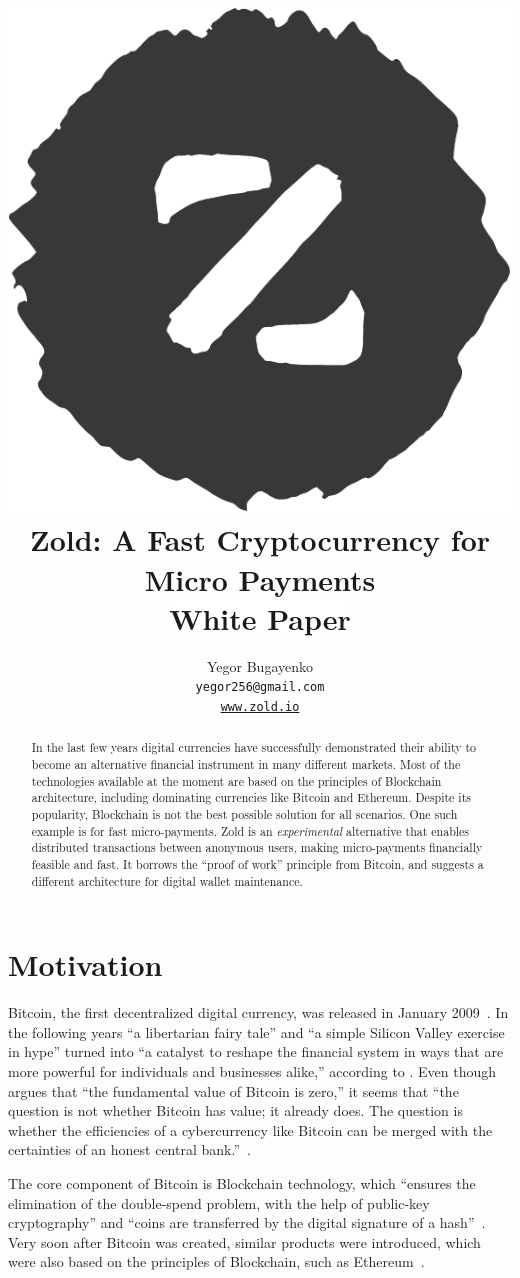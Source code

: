 \documentclass[11pt,oneside]{article}
\title{\includegraphics[scale=0.3]{../images/logo.pdf}\\
  Zold: A Fast Cryptocurrency for Micro Payments\\
  {\small\colorbox{white}{White Paper}}}
\author{Yegor Bugayenko\\
  \texttt{yegor256@gmail.com}\\
  \href{https://www.zold.io}{\texttt{www.zold.io}}\\[1em]
  \href{https://github.com/zold-io/papers/releases/tag/\zoldversion}{\texttt{\zoldversion}}}
\begin{document}
\raggedbottom

\maketitle
\begin{abstract}
In the last few years digital currencies have successfully demonstrated
their ability to become an alternative financial instrument in many
different markets. Most of the technologies available at the moment are
based on the principles of Blockchain architecture, including
dominating currencies like Bitcoin and Ethereum. Despite its
popularity, Blockchain is not the best possible solution for all scenarios.
One such example is for fast micro-payments.
Zold is an \emph{experimental} alternative that enables distributed transactions between
anonymous users, making micro-payments financially feasible and fast.
It borrows the ``proof of work'' principle from Bitcoin,
and suggests a different architecture for digital wallet maintenance.
\end{abstract}

\section{Motivation}

Bitcoin, the first decentralized digital currency, was released in January 2009~\parencite{nakamoto2008}.
In the following years ``a libertarian fairy tale'' and ``a simple Silicon Valley exercise in hype''
turned into ``a catalyst to reshape the financial system in ways that are more
powerful for individuals and businesses alike,'' according to \textcite{andreessen2014}.
Even though \textcite{cheah2015} argues that
``the fundamental value of Bitcoin is zero,''
it seems that ``the question is not whether Bitcoin has value; it already does.
The question is whether the efficiencies of a cybercurrency
like Bitcoin can be merged with the certainties of an honest central bank.''~\parencite{van2014}.

The core component of Bitcoin is Blockchain technology, which
``ensures the elimination of the double-spend problem, with the help
of public-key cryptography'' and ``coins are transferred by the
digital signature of a hash''~\parencite{pilkington2016}.
Very soon after Bitcoin was created, similar products were introduced,
which were also based on the principles of Blockchain, such as
Ethereum~\parencite{buterin2013}.
\end{document}
